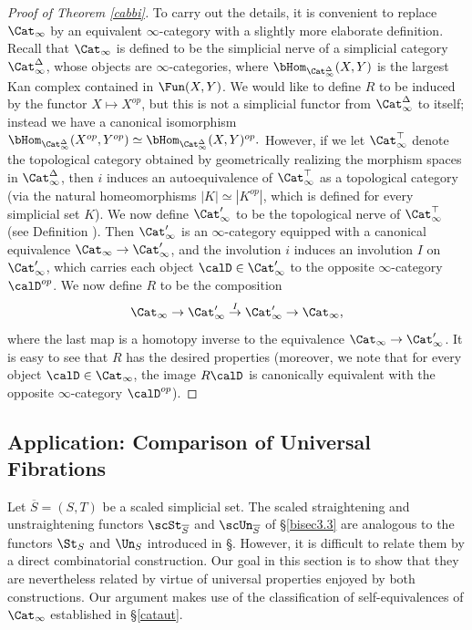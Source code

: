 \begin{proof}[Proof of Theorem \ref{cabbi}]
To carry out the details, it is convenient to replace $\Cat_{\infty}$ by an equivalent
$\infty$-category with a slightly more elaborate definition. Recall that $\Cat_{\infty}$ is defined to be the simplicial nerve of a simplicial category $\Cat_{\infty}^{\Delta}$, whose objects are $\infty$-categories, where $\bHom_{\Cat_{\infty}^{\Delta}}(X,Y)$ is the largest Kan complex contained in
$\Fun(X,Y)$. We would like to define $R$ to be induced by the functor $X \mapsto X^{op}$, but this
is not a simplicial functor from $\Cat_{\infty}^{\Delta}$ to itself; instead we have a canonical isomorphism $\bHom_{\Cat_{\infty}^{\Delta}}( X^{op}, Y^{op} )
\simeq \bHom_{\Cat_{\infty}^{\Delta}}(X,Y)^{op}.$
However, if we let $\Cat_{\infty}^{\top}$ denote the topological category obtained by geometrically realizing the morphism spaces in 
$\Cat_{\infty}^{\Delta}$, then $i$ induces an autoequivalence of $\Cat_{\infty}^{\top}$ as a topological category (via the natural homeomorphisms $| K | \simeq |K^{op}|$, which is defined for every simplicial set $K$). We now define $\Cat'_{\infty}$ to be the topological nerve of $\Cat_{\infty}^{\top}$ (see 
Definition ). Then $\Cat'_{\infty}$ is an $\infty$-category equipped with a canonical equivalence $\Cat_{\infty} \rightarrow \Cat'_{\infty}$, and the involution $i$ induces
an involution $I$ on $\Cat'_{\infty}$, which carries each object $\calD \in \Cat'_{\infty}$ to 
the opposite $\infty$-category $\calD^{op}$. We now define $R$ to be the composition
$$ \Cat_{\infty} \rightarrow \Cat'_{\infty} \stackrel{I}{\rightarrow} \Cat'_{\infty} \rightarrow \Cat_{\infty},$$
where the last map is a homotopy inverse to the equivalence $\Cat_{\infty} \rightarrow \Cat'_{\infty}$.
It is easy to see that $R$ has the desired properties (moreover, we note that for every
object $\calD \in \Cat_{\infty}$, the image $R \calD$ is canonically equivalent with the opposite $\infty$-category $\calD^{op}$).
\end{proof}

\subsection{Application: Comparison of Universal Fibrations}\label{bisec4.x}\label{bisec4.5}

Let $\overline{S} = (S,T)$ be a scaled simplicial set. The scaled straightening and unstraightening
functors $\scSt_{\overline{S}}$ and $\scUn_{\overline{S}}$ of \S \ref{bisec3.3} are analogous
to the functors $\St_{S}$ and $\Un_{S}$ introduced in \S {}. However,
it is difficult to relate them by a direct combinatorial construction. Our goal in this section is to show that they are nevertheless related by virtue of universal properties enjoyed by both constructions.
Our argument makes use of the classification of self-equivalences of $\Cat_{\infty}$
established in \S \ref{cataut}.

